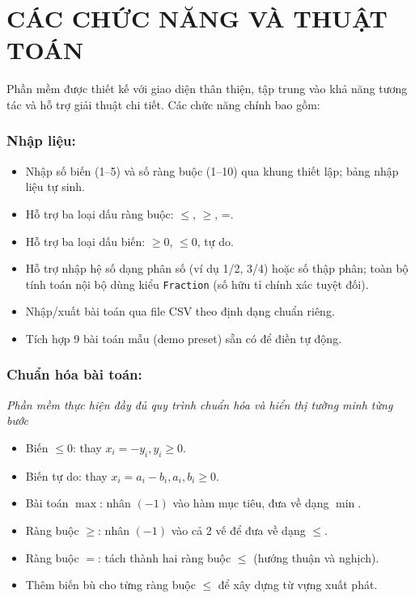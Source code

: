 \documentclass[12pt,a4paper]{article}
\begin{document}
\newpage
\section{CÁC CHỨC NĂNG VÀ THUẬT TOÁN}
Phần mềm được thiết kế với giao diện thân thiện, tập trung vào khả năng tương tác và hỗ trợ giải thuật chi tiết. Các chức năng chính bao gồm:

\subsubsection*{Nhập liệu:}
\begin{itemize}[label=\textcolor{secondary}{$\circ$}, itemsep=1pt]
    \item Nhập số biến (1–5) và số ràng buộc (1–10) qua khung thiết lập; bảng nhập liệu tự sinh. 
    \item Hỗ trợ ba loại dấu ràng buộc: $\leq$, $\geq$, =. 
    \item Hỗ trợ ba loại dấu biến: $\geq 0$, $\leq 0$, tự do. 
    \item Hỗ trợ nhập hệ số dạng phân số (ví dụ 1/2, 3/4) hoặc số thập phân; toàn bộ tính toán nội bộ dùng kiểu \texttt{Fraction} (số hữu tỉ chính xác tuyệt đối). 
    \item Nhập/xuất bài toán qua file CSV theo định dạng chuẩn riêng. 
    \item Tích hợp 9 bài toán mẫu (demo preset) sẵn có để điền tự động. 
\end{itemize}

\subsubsection*{Chuẩn hóa bài toán:}
\textit{Phần mềm thực hiện đầy đủ quy trình chuẩn hóa và hiển thị tường minh từng bước}
\begin{itemize}[label=\textcolor{secondary}{$\circ$}, itemsep=1pt]
    \item Biến $\leq 0$: thay $x_i = -y_i, y_i \geq 0$.
    \item Biến tự do: thay $x_i = a_i - b_i, a_i, b_i \geq 0$.
    \item Bài toán $\max$: nhân $(-1)$ vào hàm mục tiêu, đưa về dạng $\min$. 
    \item Ràng buộc $\geq$: nhân $(-1)$ vào cả 2 vế để đưa về dạng $\leq$. 
    \item Ràng buộc $=$: tách thành hai ràng buộc $\leq$ (hướng thuận và nghịch). 
    \item Thêm biến bù cho từng ràng buộc $\leq$ để xây dựng từ vựng xuất phát.
\end{itemize}
\end{document}
